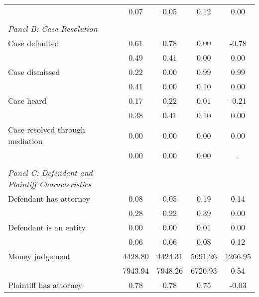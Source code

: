 \begin{table}[htbp]
\begin{tabular}{l*{4}{c}}
                    &       0.07 &       0.05 &       0.12 &        0.00\\
\vspace{0.1em} \\ \emph{Panel B: Case Resolution}&            &            &            &            \\
\hspace{0.25cm}Case defaulted&       0.61 &       0.78 &       0.00 &       -0.78\\
                    &       0.49 &       0.41 &       0.00 &        0.00\\
\hspace{0.25cm}Case dismissed&       0.22 &       0.00 &       0.99 &        0.99\\
                    &       0.41 &       0.00 &       0.10 &        0.00\\
\hspace{0.25cm}Case heard&       0.17 &       0.22 &       0.01 &       -0.21\\
                    &       0.38 &       0.41 &       0.10 &        0.00\\
\hspace{0.25cm}Case resolved through mediation&       0.00 &       0.00 &       0.00 &        0.00\\
                    &       0.00 &       0.00 &       0.00 &           .\\
\vspace{0.1em} \\ \emph{Panel C: Defendant and Plaintiff Characteristics}&            &            &            &            \\
\hspace{0.25cm}Defendant has attorney&       0.08 &       0.05 &       0.19 &        0.14\\
                    &       0.28 &       0.22 &       0.39 &        0.00\\
\hspace{0.25cm}Defendant is an entity&       0.00 &       0.00 &       0.01 &        0.00\\
                    &       0.06 &       0.06 &       0.08 &        0.12\\
\hspace{0.25cm}Money judgement&    4428.80 &    4424.31 &    5691.26 &     1266.95\\
                    &    7943.94 &    7948.26 &    6720.93 &        0.54\\
\hspace{0.25cm}Plaintiff has attorney&       0.78 &       0.78 &       0.75 &       -0.03\\

\end{tabular}
\end{table}
